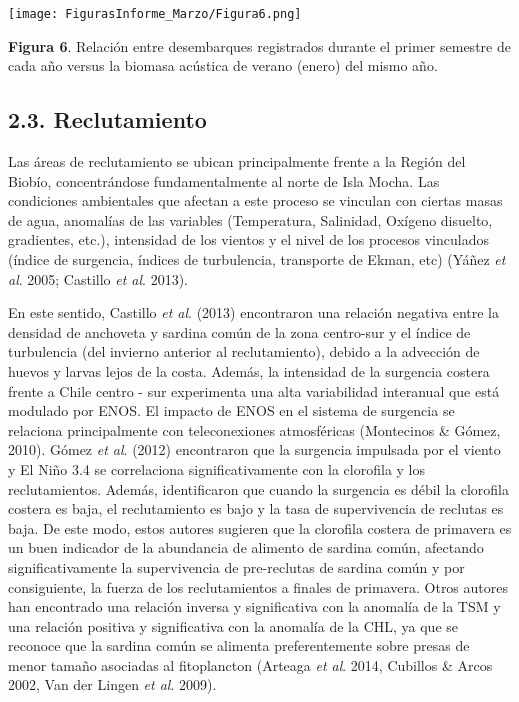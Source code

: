 \documentclass[
  spanish,
]{article}
\begin{document}
\begin{center}
\texttt{[image: FigurasInforme\_Marzo/Figura6.png]}
\end{center}

\small

\textbf{Figura 6}. Relación entre desembarques registrados durante el
primer semestre de cada año versus la biomasa acústica de verano (enero)
del mismo año. \vspace{0.5cm}

\normalsize

\hypertarget{reclutamiento}{%
\subsection{2.3. Reclutamiento}\label{reclutamiento}}

Las áreas de reclutamiento se ubican principalmente frente a la Región
del Biobío, concentrándose fundamentalmente al norte de Isla Mocha. Las
condiciones ambientales que afectan a este proceso se vinculan con
ciertas masas de agua, anomalías de las variables (Temperatura,
Salinidad, Oxígeno disuelto, gradientes, etc.), intensidad de los
vientos y el nivel de los procesos vinculados (índice de surgencia,
índices de turbulencia, transporte de Ekman, etc) (Yáñez \emph{et al}.
2005; Castillo \emph{et al}. 2013).

En este sentido, Castillo \emph{et al}. (2013) encontraron una relación
negativa entre la densidad de anchoveta y sardina común de la zona
centro-sur y el índice de turbulencia (del invierno anterior al
reclutamiento), debido a la advección de huevos y larvas lejos de la
costa. Además, la intensidad de la surgencia costera frente a Chile
centro - sur experimenta una alta variabilidad interanual que está
modulado por ENOS. El impacto de ENOS en el sistema de surgencia se
relaciona principalmente con teleconexiones atmosféricas (Montecinos \&
Gómez, 2010). Gómez \emph{et al}. (2012) encontraron que la surgencia
impulsada por el viento y El Niño 3.4 se correlaciona significativamente
con la clorofila y los reclutamientos. Además, identificaron que cuando
la surgencia es débil la clorofila costera es baja, el reclutamiento es
bajo y la tasa de supervivencia de reclutas es baja. De este modo, estos
autores sugieren que la clorofila costera de primavera es un buen
indicador de la abundancia de alimento de sardina común, afectando
significativamente la supervivencia de pre-reclutas de sardina común y
por consiguiente, la fuerza de los reclutamientos a finales de
primavera. Otros autores han encontrado una relación inversa y
significativa con la anomalía de la TSM y una relación positiva y
significativa con la anomalía de la CHL, ya que se reconoce que la
sardina común se alimenta preferentemente sobre presas de menor tamaño
asociadas al fitoplancton (Arteaga \emph{et al}. 2014, Cubillos \& Arcos
2002, Van der Lingen \emph{et al}. 2009).
\end{document}
